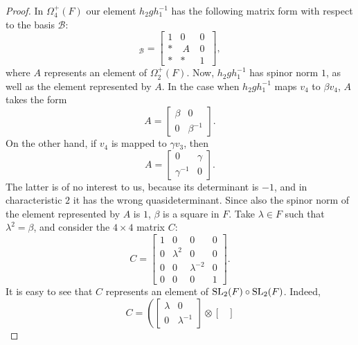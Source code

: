 \begin{proof}
	In $\Omega_4^+(F)$ our element $h_2 g h_1^{-1}$ has the following matrix form with respect to the basis $\mathcal{B}$:
	\begin{equation*}
		[h_2 g h_1^{-1}]_{\mathcal{B}} = 
		\left[
	    \begin{array}{c|c|c}
		1 & 0 & 0\  \\ \hline 
		* &\  A\   & 0\  \\ \hline
		* & * & 1\ 
	    \end{array}
	\right],
	\end{equation*}
	where $A$ represents an element of $\Omega_2^+(F)$. Now, $h_2 g h_1^{-1}$ has spinor norm $1$, as well as the element 
	represented by $A$. In the case when $h_2 g h_1^{-1}$ maps $v_4$ to $\beta v_4$, $A$ takes the form
	\begin{equation*}
		A = \begin{bmatrix}
			\beta & 0 \\
			0 & \beta^{-1}
		\end{bmatrix}.
	\end{equation*}
	On the other hand, if $v_4$ is mapped to $\gamma v_3$, then 
	\begin{equation*}
		A = \begin{bmatrix}
			0 & \gamma \\
			\gamma^{-1} & 0
		\end{bmatrix}.
	\end{equation*}
	The latter is of no interest to us, because its determinant is $-1$, and in characteristic $2$ it has the wrong quasideterminant.
	Since also the spinor norm of the element represented by $A$ is $1$, $\beta$ is a square in $F$. Take $\lambda \in F$ such
	that $\lambda^2 = \beta$, and consider the $4\times 4$ matrix $C$:
	\begin{equation*}
		C = \begin{bmatrix}
			1 & 0 & 0 & 0 \\
			0 & \lambda^2 & 0 & 0 \\
			0 & 0 & \lambda^{-2} & 0 \\
			0 & 0 & 0 & 1
		\end{bmatrix}.
	\end{equation*}
	It is easy to see that $C$ represents an element of $\mathrm{SL}_2(F) \circ \mathrm{SL}_2(F)$. Indeed,
	\begin{equation*}
		C = \left( \begin{bmatrix}
			\lambda & 0 \\
			0 & \lambda^{-1}
		\end{bmatrix} \otimes
		\begin{bmatrix}

\end{bmatrix}
\end{equation*}
\end{proof}

